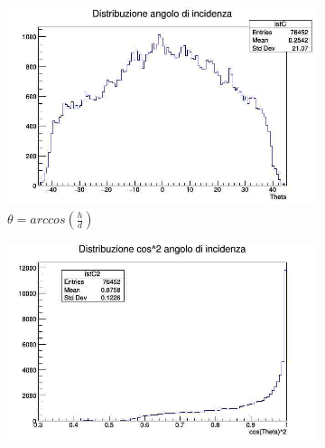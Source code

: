\documentclass[a4paper,twocolumn]{article}
\begin{document}
\begin{figure}[H]
\begin{subfigure}[b]{0.4\textwidth}
\includegraphics[width=\textwidth]{./immagini/TimeOfFlight/DistrTheta.jpg}
\caption{$\theta = arccos(\frac{h}{d})$}
\label{fig:DistrTheta}
\end{subfigure}
\hfill
\begin{subfigure}[b]{0.4\textwidth}
\includegraphics[width=\textwidth]{./immagini/TimeOfFlight/DistrCos2.jpg}
\caption{}
\label{fig:DistrCos2}
\end{subfigure}
\caption{}
\end{figure}










\newpage
\appendix
\end{document}
